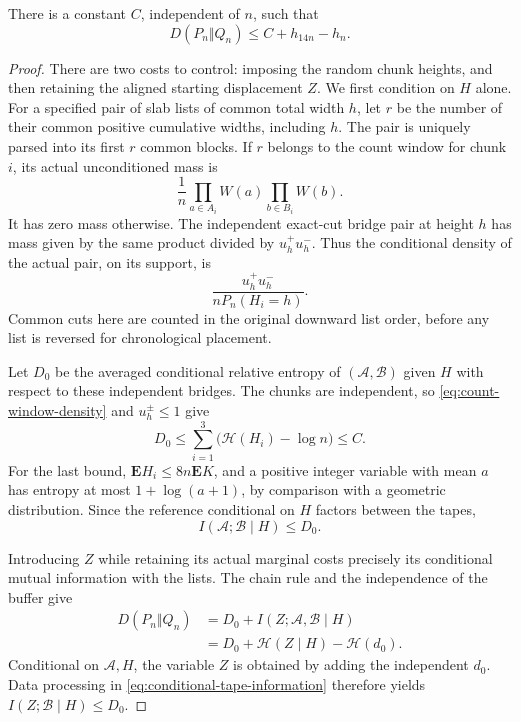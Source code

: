 \begin{lemma}\label{lem:entropy-comparison}
There is a constant $C$, independent of $n$, such that
\[
 D(P_n\Vert Q_n)\le C+h_{14n}-h_n.
\]
\end{lemma}
\begin{proof}
There are two costs to control: imposing the random chunk heights,
and then retaining the aligned starting displacement $Z$.  We first
condition on $H$ alone.  For a specified
pair of slab lists of common total width $h$, let $r$ be the number of
their common positive cumulative widths, including $h$.  The pair is
uniquely parsed into its first $r$ common blocks.  If $r$ belongs to the
count window for chunk $i$, its actual unconditioned mass is
\[
 \frac1n\prod_{a\in A_i}W(a)\prod_{b\in B_i}W(b).
\]
It has zero mass otherwise.  The independent exact-cut bridge pair at
height $h$ has mass given by the same product divided by $u_h^+u_h^-$.
Thus the conditional density of the actual pair, on its support, is
\begin{equation}\label{eq:count-window-density}
 \frac{u_h^+u_h^-}{nP_n(H_i=h)}.
\end{equation}
Common cuts here are counted in the original downward list order,
before any list is reversed for chronological placement.

Let $D_0$ be the averaged conditional relative entropy of
$(\mathcal A,\mathcal B)$ given $H$ with respect to these independent
bridges.  The chunks are independent, so \eqref{eq:count-window-density}
and $u_h^\pm\le1$ give
\[
 D_0\le\sum_{i=1}^3\bigl(\mathcal H(H_i)-\log n\bigr)\le C.
\]
For the last bound, $\mathbf E H_i\le8n\mathbf E K$, and a positive
integer variable with mean $a$ has entropy at most $1+\log(a+1)$,
by comparison with a geometric distribution.  Since the reference
conditional on $H$ factors between the tapes,
\begin{equation}\label{eq:conditional-tape-information}
 I(\mathcal A;\mathcal B\mid H)\le D_0.
\end{equation}

Introducing $Z$ while retaining its actual marginal costs precisely
its conditional mutual information with the lists.  The chain rule
and the independence of the buffer give
\begin{equation}\label{eq:endpoint-information-cost}
 \begin{split}
 D(P_n\Vert Q_n)
 &=D_0+I(Z;\mathcal A,\mathcal B\mid H)\\
 &=D_0+\mathcal H(Z\mid H)-\mathcal H(d_0).
 \end{split}
\end{equation}
Conditional on $\mathcal A,H$, the variable $Z$ is obtained by adding
the independent $d_0$.  Data processing in
\eqref{eq:conditional-tape-information} therefore yields
$I(Z;\mathcal B\mid H)\le D_0$.


\end{proof}
